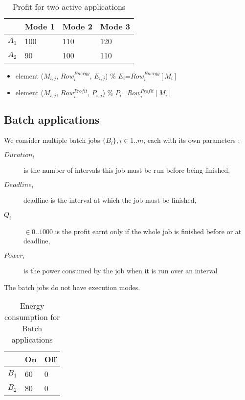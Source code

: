 \documentclass[a4paper]{article}
\begin{document}
\begin{table}[H]
\begin{center}
    \begin{tabular}{ | l | l | l | l |}
    \hline
      & Mode 1 & Mode 2 & Mode 3 \\ \hline
    $A_1$ & 100 & 110 & 120 \\ \hline
    $A_2$ & 90 & 100 & 110 \\
    \hline
    \end{tabular}
\end{center}
\caption{Profit for two active applications}
\end{table}

\begin{itemize}
 \item element ($M_{i,j}$, $Row^{Energy}_{i}$, $E_{i,j}$) \% \quad $E_i$=$Row^{Energy}_{i} [M_i]$
 \item element ($M_{i,j}$, $Row^{Profit}_{i}$, $P_{i,j}$) \% \quad $P_i$=$Row^{Profit}_{i} [M_i]$
\end{itemize}


\subsection{Batch applications}

We consider multiple batch jobs $\{B_{i}\}, i \in1..m$, each with its own parameters :

\begin{description}
\item [$Duration_i$] is the number of intervals this job must be run before being finished,
\item [$Deadline_i$] deadline is the interval at which the job must be finished,
\item [$Q_i$] $\in 0..1000$ is the profit earnt only if the whole job is finished before or at deadline,
\item [$Power_i$] is the power consumed by the job when it is run over an interval
\end{description}
The batch jobs do not have execution modes.

\begin{table}[H]
\begin{center}
  \begin{tabular}{ | l | l | l | }
     \hline
      & On & Off \\ \hline
    $B_1$ & 60 & 0 \\ \hline
    $B_2$ & 80 & 0 \\
    \hline
    \end{tabular}
\end{center}
\caption{Energy consumption for Batch applications}
\end{table}
\end{document}
